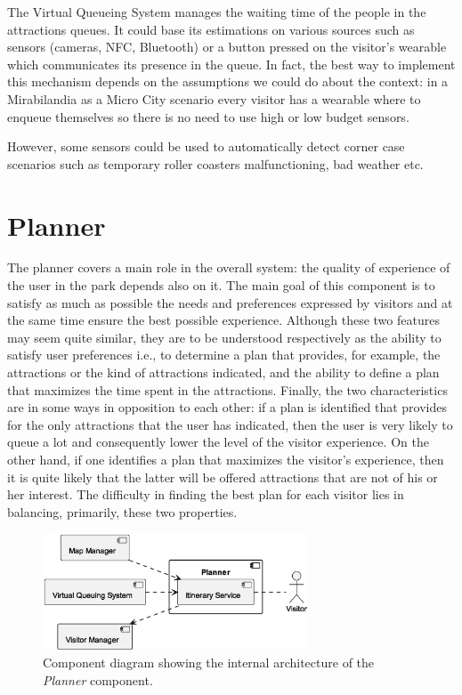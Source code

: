 The Virtual Queueing System manages the waiting time of the people in the attractions queues.
It could base its estimations on various sources such as sensors (cameras, NFC, Bluetooth) or
a button pressed on the visitor's wearable which communicates its presence in the queue.
In fact, the best way to implement this mechanism depends on the assumptions we could do about the context: in a Mirabilandia as a Micro City scenario every visitor has a wearable where to enqueue themselves so there is no need to use high or low budget sensors.

However, some sensors could be used to automatically detect corner case scenarios such as temporary roller coasters malfunctioning, bad weather etc.

\section{Planner}

The planner covers a main role in the overall system: the quality of experience of the user in the park depends also on it.
The main goal of this component is to satisfy as much as possible the needs and preferences expressed by visitors and at the same time ensure the
best possible experience.
Although these two features may seem quite similar, they are to be understood respectively as the ability to satisfy user preferences i.e., to
determine a plan that provides, for example, the attractions or the kind of attractions indicated, and the ability to define a plan that maximizes
the time spent in the attractions.
Finally, the two characteristics are in some ways in opposition to each other: if a plan is identified that provides for the only attractions that
the user has indicated, then the user is very likely to queue a lot and consequently lower the level of the visitor experience. On the other hand, if
one identifies a plan that maximizes the visitor's experience, then it is quite likely that the latter will be offered attractions that are not of
his or her interest.
The difficulty in finding the best plan for each visitor lies in balancing, primarily, these two properties. 

\begin{figure}[H]
	\centering
	\includegraphics[width=0.7\textwidth]{img/planner.eps}
	\caption{Component diagram showing the internal architecture of the \textit{Planner} component.
	}
	\label{fig:planner-arch}
\end{figure}

